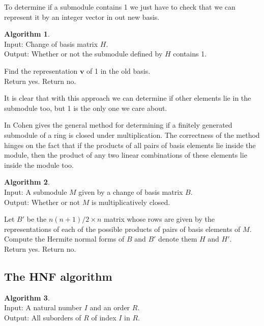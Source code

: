 \documentclass[12pt,a4paper,abstracton,bibtotoc]{scrreprt}
\theoremstyle{definition}
\newtheorem{alg}{Algorithm}
\begin{document}
To determine if a submodule contains 1 we just have to check that we can represent it by an integer vector in out new basis.

\begin{alg}\label{alg:hasone}~\\
Input: Change of basis matrix $H$.\\
Output: Whether or not the submodule defined by $H$ contains 1.\\
\begin{algorithm}[H]
Find the representation $\mathbf v$ of 1 in the old basis.\\
{
Return yes.
}
{
Return no.
}
\end{algorithm}
\end{alg}

It is clear that with this approach we can determine if other elements lie in the submodule too, but 1 is the only one we care about.

In \cite{cohen93} Cohen gives the general method for determining if a finitely generated submodule of a ring is closed under multiplication.
The correctness of the method hinges on the fact that if the products of all pairs of basis elements lie inside the module, then the product of any two linear combinations of these elements lie inside the module too.

\begin{alg}
\label{alg:multclose}~\\
Input: A submodule $M$ given by a change of basis matrix $B$.\\
Output: Whether or not $M$ is multiplicatively closed.\\
\begin{algorithm}[H]
Let $B'$ be the $n(n+1)/2\times n$ matrix whose rows are given by the representations of each of the possible products of pairs of basis elements of $M$.\\
Compute the Hermite normal forms of $B$ and $B'$ denote them $H$ and $H'$.\\
{
Return yes.
}
{
Return no.
}
\end{algorithm}
\end{alg} 

\subsection{The HNF algorithm}
\begin{alg}~\\
Input: A natural number $I$ and an order $R$.\\
Output: All suborders of $R$ of index $I$ in $R$.\\
\begin{algorithm}[H]
\end{algorithm}
\end{alg}
\end{document}
